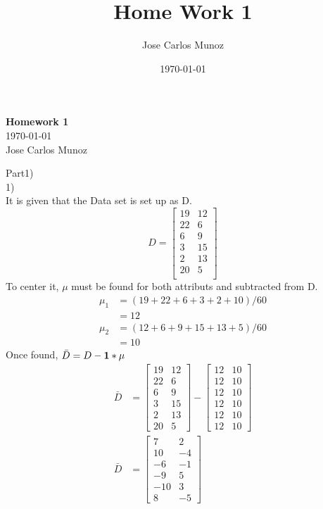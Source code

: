 \documentclass[12pt,english]{article}
\title{Home Work 1}
\date{\today}
\author{Jose Carlos Munoz}
\begin{document}
\begin{center}
    \Large
    \textbf{Homework 1}\\
    \small
    \today\\
    \large
    Jose Carlos Munoz
\end{center}
Part1)\\
1)\\
It is given that the Data set is set up as D.\\
\begin{equation*}
D = 
\begin{bmatrix}
19 & 12 \\
22 &  6 \\
 6  &  9 \\
 3 &  15 \\
 2 &  13 \\
20 &  5 \\
\end{bmatrix}
\end{equation*}
To center it, $\mu$ must be found for both attributs and subtracted from D.
\begin{equation*}
\begin{split}
\mu_{1} &= (19+22+6+3+2+10) / 60\\
 &= 12 \\
\mu_{2} &= (12+6+9+15+13+5) / 60\\
 &= 10
\end{split}
\end{equation*}
Once found, $\bar{D}= D -\bold{1}*\mu$
\begin{equation*}
\begin{split}
\bar{D}&=
\begin{bmatrix}
19 & 12 \\
22 &  6 \\
 6  &  9 \\
 3 &  15 \\
 2 &  13 \\
20 &  5 
\end{bmatrix}
-
\begin{bmatrix}
12 & 10 \\
12 & 10 \\
12 & 10 \\
12 & 10 \\
12 & 10 \\
12 & 10 
\end{bmatrix}\\
\bar{D}&=
\begin{bmatrix}
    7 &  2 \\
  10 & -4 \\
   -6 & -1 \\
   -9 &  5 \\
 -10 &  3 \\
    8 & -5 
\end{bmatrix}
\end{split}
\end{equation*}
\end{document}
